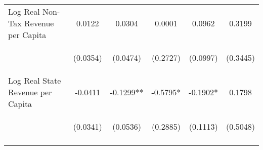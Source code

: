 \begin{center}
\begin{tabular}{lccccc}
\noalign{\smallskip}Log Real Non-Tax Revenue per Capita & \begin{scriptsize}0.0122\end{scriptsize} & \begin{scriptsize}0.0304\end{scriptsize} & \begin{scriptsize}0.0001\end{scriptsize} & \begin{scriptsize}0.0962\end{scriptsize} & \begin{scriptsize}0.3199\end{scriptsize}\\
 & \begin{scriptsize}(0.0354)\end{scriptsize} & \begin{scriptsize}(0.0474)\end{scriptsize} & \begin{scriptsize}(0.2727)\end{scriptsize} & \begin{scriptsize}(0.0997)\end{scriptsize} & \begin{scriptsize}(0.3445)\end{scriptsize}\\
\noalign{\smallskip}Log Real State Revenue per Capita & \begin{scriptsize}-0.0411\end{scriptsize} & \begin{scriptsize}-0.1299**\end{scriptsize} & \begin{scriptsize}-0.5795*\end{scriptsize} & \begin{scriptsize}-0.1902*\end{scriptsize} & \begin{scriptsize}0.1798\end{scriptsize}\\
 & \begin{scriptsize}(0.0341)\end{scriptsize} & \begin{scriptsize}(0.0536)\end{scriptsize} & \begin{scriptsize}(0.2885)\end{scriptsize} & \begin{scriptsize}(0.1113)\end{scriptsize} & \begin{scriptsize}(0.5048)\end{scriptsize}\\
\noalign{\smallskip}\hline\end{tabular}\\
\end{center}
